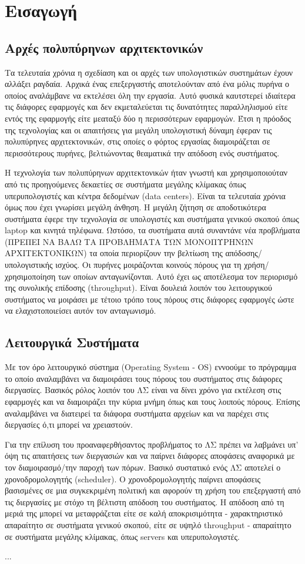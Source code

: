 \chapter{Εισαγωγή}
\section{Αρχές πολυπύρηνων αρχιτεκτονικών}
Τα τελευταία χρόνια η σχεδίαση και οι αρχές των υπολογιστικών συστημάτων έχουν 
αλλάξει ραγδαία. Αρχικά ένας επεξεργαστής αποτελούνταν από ένα μόλις πυρήνα ο 
οποίος  αναλάμβανε να εκτελέσει όλη την εργασία. Αυτό φυσικά καυτστερεί 
ιδιαίτερα τις διάφορες εφαρμογές και δεν εκμεταλεύεται τις δυνατότητες 
παραλληλισμού είτε εντός της εφαρμογής είτε μεαταξύ δύο η περισσότερων 
εφαρμογών. Έτσι η πρόοδος της τεχνολογίας και οι απαιτήσεις για μεγάλη 
υπολογιστική δύναμη έφεραν τις πολυπύρηνες αρχιτεκτονικών, στις οποίες ο φόρτος 
εργασίας διαμοιράζεται σε περισσότερους πυρήνες, βελτιώνοντας θεαματικά την 
απόδοση ενός συστήματος.
\par
Η τεχνολογία των πολυπύρηνων αρχιτεκτονικών ήταν γνωστή και χρησιμοποιούταν από 
τις προηγούμενες δεκαετίες σε συστήματα μεγάλης κλίμακας όπως υπερυπολογιστές 
και κέντρα δεδομένων (data centers). Είναι τα τελευταία χρόνια όμως που έχει 
γνωρίσει μεγάλη άνθηση. Η μεγάλη ζήτηση σε αποδοτικότερα συστήματα έφερε την 
τεχνολογία σε υπολογιστές και συστήματα γενικού σκοπού όπως laptop και κινητά 
τηλέφωνα.
Ωστόσο, τα συστήματα αυτά συναντάνε νέα προβλήματα (ΠΡΕΠΕΙ ΝΑ ΒΑΛΩ ΤΑ ΠΡΟΒΛΗΜΑΤΑ 
ΤΩΝ ΜΟΝΟΠΥΡΗΝΩΝ ΑΡΧΙΤΕΚΤΟΝΙΚΩΝ) τα οποία περιορίζουν την βελτίωση της 
απόδοσης/υπολογιστικής ισχύος. Οι πυρήνες μοιράζονται κοινούς πόρους για τη 
χρήση/χρησιμοποίηση των οποίων ανταγωνίζονται. Αυτό έχει ως αποτέλεσμα τον 
περιορισμό της συνολικής επίδοσης (throughput). Είναι δουλειά λοιπόν του 
λειτουργικού συστήματος να μοιράσει με τέτοιο τρόπο τους πόρους στις διάφορες 
εφαρμογές ώστε να ελαχιστοποιείσει αυτόν τον ανταγωνισμό.
\section{Λειτουργικά Συστήματα}
Με τον όρο λειτουργικό σύστημα (Operating System - OS) εννοούμε το πρόγραμμα το 
οποίο αναλαμβάνει να διαμοιράσει τους πόρους του συστήματος στις διάφορες 
διεργασίες. Βασικός ρόλος λοιπόν του ΛΣ είναι να δίνει χρόνο για εκτέλεση στις 
εφαρμογές και να διαμοιράζει την κύρια μνήμη όπως και τους λοιπούς πόρους. 
Επίσης αναλαμβάνει να διατειρεί τα διάφορα συστήματα αρχείων και να παρέχει στις 
διεργασίες ό,τι μπορεί να χρειαστούν.
\par
Για την επίλυση του προαναφερθήσαντος προβλήματος το ΛΣ πρέπει να λαβμάνει υπ' 
όψη τις απαιτήσεις των διεργασιών και να παίρνει διάφορες αποφάσεις αναφορικά με 
τον διαμοιρασμό/την παροχή των πόρων. Βασικό συστατικό ενός ΛΣ αποτελεί ο 
χρονοδρομολογητής (scheduler). Ο χρονοδρομολογητής παίρνει αποφάσεις βασισμένες 
σε μια συγκεκριμένη πολιτική και αφορούν τη χρήση του επεξεργαστή από τις 
διεργασίες με στόχο τη βέλτιστη απόδοση του συστήματος. Η απόδοση από τη μεριά 
της μπορεί να μεταφράζεται είτε σε καλή αποκρισιμότητα - χαρακτηριστικό 
απαραίτητο σε συστήματα γενικού σκοπού, είτε σε υψηλό throughput - απαραίτητο σε 
συστήματα μεγάλης κλίμακας, όπως servers και υπερυπολογιστές.
\par
...
